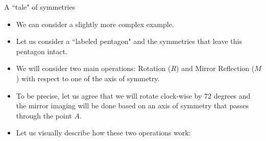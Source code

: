 \documentclass[ %
 10pt, xcolor={dvipsnames,svgnames,x11names,hyperref},
   hyperref={colorlinks=true,citecolor=green,linkcolor=DarkRed,urlcolor=ProcessBlue,anchorcolor=blue}
  ]{beamer}
\newenvironment{stepitemize}{\begin{itemize}[<+->]}{\end{itemize} }
\begin{document}
\begin{frame}{A ``tale" of symmetries}
    \begin{stepitemize}
    \item We can consider a slightly more complex example.
\item Let us consider a ``labeled pentagon" and the symmetries that leave this pentagon intact.
\item We will consider two main operations: Rotation ($R$) and Mirror Reflection ($M$) with respect to one of the axis of symmetry.
\item To be precise, let us agree that we will rotate clock-wise by $72$ degrees and the mirror imaging will be done based on an axis of symmetry that passes through the point $A$.
\item Let us visually describe how these two operations work:
    \end{stepitemize}
\end{frame}
\end{document}
